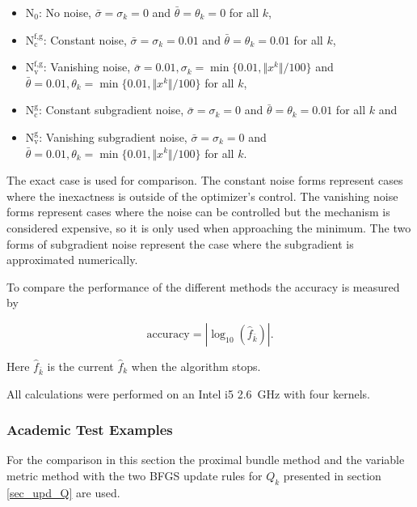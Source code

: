 \begin{itemize}[label={--}]
	\item \(\text{N}_0\): No noise, \(\bar{\sigma}=\sigma_k=0\) and \(\bar{\theta}=\theta_k=0\) for all \(k\),
	\item \(\text{N}_{\text{c}}^{\text{f,g}}\): Constant noise, \(\bar{\sigma}=\sigma_k=0.01\) and \(\bar{\theta}=\theta_k=0.01\) for all \(k\),
	\item \(\text{N}_{\text{v}}^{\text{f,g}}\): Vanishing noise, \(\bar{\sigma}=0.01, \sigma_k = \min\{0.01,\Vert x^k\Vert/100\}\) and \(\bar{\theta}=0.01, \theta_k=\min\{0.01,\Vert x^k\Vert/100\}\) for all \(k\),
	\item \(\text{N}_{\text{c}}^{\text{g}}\): Constant subgradient noise, \(\bar{\sigma}=\sigma_k=0\) and \(\bar{\theta}=\theta_k=0.01\) for all \(k\) and 
	\item \(\text{N}_{\text{v}}^{\text{g}}\): Vanishing subgradient noise, \(\bar{\sigma}=\sigma_k=0\) and \(\bar{\theta}=0.01, \theta_k=\min\{0.01,\Vert x^k\Vert/100\}\) for all \(k\).
\end{itemize}
The exact case is used for comparison. The constant noise forms represent cases where the inexactness is outside of the optimizer's control. The vanishing noise forms represent cases where the noise can be controlled  but the mechanism is considered expensive, so it is only used when approaching the minimum.
The two forms of subgradient noise represent the case where the subgradient is approximated numerically.


To compare the performance of the different methods the accuracy is measured by

\[ \text{accuracy} = |\log_{10}(\hat{f}_{\bar{k}})|. \]

Here \(\hat{f}_{\bar{k}}\) is the current \(\hat{f}_k\) when the algorithm stops.

All calculations were performed on an Intel i5 2.6~GHz with four kernels.


\subsubsection{Academic Test Examples}

For the comparison in this section the proximal bundle method and the variable metric method with the two BFGS update rules for \(Q_k\) presented in section \ref{sec_upd_Q} are used. %

